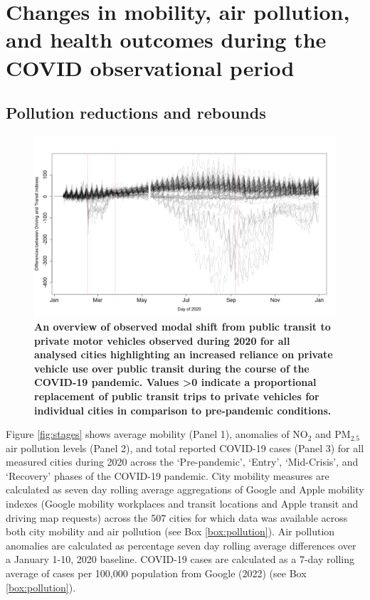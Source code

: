 \documentclass[preprint,10pt]{elsarticle} %
\begin{document}
\section*{\textcolor{OliveGreen}{Changes in mobility, air pollution, and health outcomes during the COVID observational period}}
\subsection*{Pollution reductions and rebounds}

\begin{figure}
\centering
\includegraphics[trim={0 0 0 0},clip,scale=0.4]{Images2/DrivingMinusTransit.png}
\caption{\bf An overview of observed modal shift from public transit to private motor vehicles observed during 2020 for all analysed cities highlighting an increased reliance on private vehicle use over public transit during the course of the COVID-19 pandemic. Values \textgreater 0 indicate a proportional replacement of public transit trips to private vehicles for individual cities in comparison to pre-pandemic conditions.}  
 \label{fig:driv_trans}
\end{figure}


Figure \ref{fig:stages} shows average mobility (Panel 1), anomalies of NO$_{2}$ and PM$_{2.5}$ air pollution levels (Panel 2), and total reported COVID-19 cases (Panel 3) for all measured cities during 2020 across the `Pre-pandemic', `Entry', `Mid-Crisis', and `Recovery' phases of the COVID-19 pandemic. City mobility measures are calculated as seven day rolling average aggregations of Google and Apple mobility indexes (Google mobility workplaces and transit locations and Apple transit and driving map requests) across the 507 cities for which data was available across both city mobility and air pollution (see Box \ref{box:pollution}). Air pollution anomalies are calculated as percentage seven day rolling average differences over a January 1-10, 2020 baseline. COVID-19 cases are calculated as a 7-day rolling average of cases per 100,000 population from Google (2022)\cite{Google2022} (see Box \ref{box:pollution}).
\end{document}
